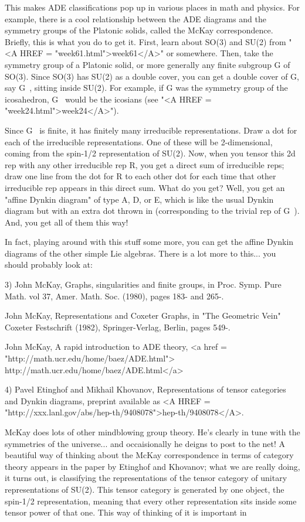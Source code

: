 This makes ADE classifications pop up in various places in math and
physics.  For example, there is a cool relationship between the ADE
diagrams and the symmetry groups of the Platonic solids, called the
McKay correspondence.  Briefly, this is what you do to get it.  First,
learn about SO(3) and SU(2) from 
"<A HREF = "week61.html">week61</A>" or somewhere.  Then, take the
symmetry group of a Platonic solid, or more generally any finite
subgroup G of SO(3).  Since SO(3) has SU(2) as a double cover, you can
get a double cover of G, say G~, sitting inside SU(2).  For example,
if G was the symmetry group of the icosahedron, G~ would be the icosians
(see "<A HREF = "week24.html">week24</A>").  

Since G~ is finite, it has finitely many irreducible representations.  
Draw a dot for each of the irreducible representations.  
One of these will be 2-dimensional, coming from the
spin-1/2 representation of SU(2).  Now, when you tensor this 2d rep with any
other irreducible rep R, you get a direct sum of irreducible reps; draw
one line from the dot for R to each other dot for each time that other
irreducible rep appears in this direct sum.  What do you get?  Well, you
get an "affine Dynkin diagram" of type A, D, or E, which is like the
usual Dynkin diagram but with an extra dot thrown in (corresponding
to the trivial rep of G~).  And, you get all of them this way!

In fact, playing around with this stuff some more, you can get the
affine Dynkin diagrams of the other simple Lie algebras.  There is a lot
more to this... you should probably look at:

3) John McKay, Graphs, singularities and finite groups, in Proc. Symp. Pure
Math. vol 37, Amer. Math. Soc. (1980), pages 183- and 265-.

John McKay, Representations and Coxeter Graphs, in "The Geometric Vein"
Coxeter Festschrift (1982), Springer-Verlag, Berlin, pages 549-.

John McKay, A rapid introduction to ADE theory, 
<a href = "http://math.ucr.edu/home/baez/ADE.html">
http://math.ucr.edu/home/baez/ADE.html</a>

4) Pavel Etinghof and Mikhail Khovanov, Representations of tensor
categories and Dynkin diagrams, preprint available as <A HREF = "http://xxx.lanl.gov/abs/hep-th/9408078">hep-th/9408078</A>.

McKay does lots of other mindblowing group theory.  He's clearly in tune
with the symmetries of the universe... and occaisionally he deigns to
post to the net!  A beautiful way of thinking about the McKay
correspondence in terms of category theory appears in the paper by
Etinghof and Khovanov; what we are really doing, it turns out, is
classifying the representations of the tensor category of unitary
representations of SU(2).  This tensor category is generated by one
object, the spin-1/2 representation, meaning that every other
representation sits inside some tensor power of that one.  This way of
thinking of it is important in


